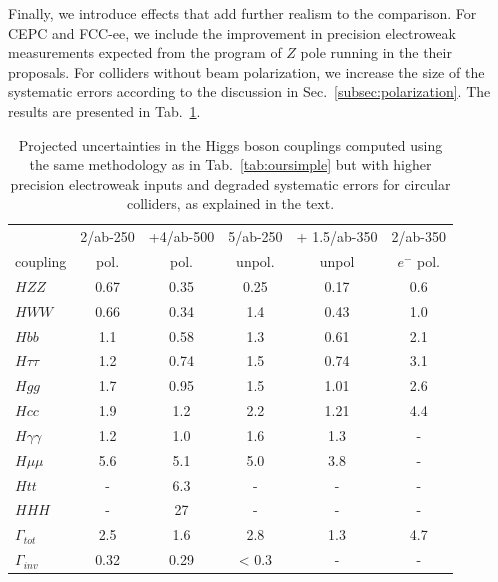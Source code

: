 Finally, we introduce effects that add further realism to the
comparison.  For CEPC and FCC-ee, we include the improvement in
precision electroweak measurements expected from the program of $Z$
pole running in the their proposals.  For colliders without beam
polarization, we increase the size of the systematic errors according
to the discussion in  
Sec.~\ref{subsec:polarization}. The results are presented in 
Tab.~\ref{tab:ournotsosimple}. 

\begin{table}[!htbp]
\begin{center}
\begin{tabular}{l|cc|c|c|c}
 &  2/ab-250 & +4/ab-500 &  5/ab-250 &  + 1.5/ab-350 &  2/ab-350 \\
coupling &  pol.  &   pol.  &   unpol.  &  unpol &  $e^-$  pol. 
  \\  \hline 
$HZZ$            &             0.67&   0.35    &   0.25   & 0.17     &  0.6            \\ 
$HWW$            &         0.66  &   0.34   &   1.4   &   0.43   &   1.0    \\ 
 $Hbb$            &     1.1  &  0.58   &  1.3    &    0.61  &   2.1       \\ 
$H\tau\tau$    &          1.2  &   0.74   &   1.5   &  0.74    &   3.1     \\ 
$Hgg$ &                      1.7  & 0.95       &  1.5    &  1.01    &   2.6    \\ 
$Hcc$                       &   1.9  &  1.2   &   2.2   &   1.21   &    4.4  \\ 
$H\gamma\gamma$ &  1.2 &   1.0     &  1.6    &   1.3   &    -    \\ 
$H\mu\mu$                &  5.6  &  5.1     &  5.0    &  3.8    &    -
 \\ 
$Htt$  &                       -     &      6.3     &  -    &  -    &
-     \\ 
$HHH$                         &  -    &   27     &   -   &   -   &   -
 \\ \hline 
$\Gamma_{tot}$             & 2.5  & 1.6    &   2.8    &  1.3     &
4.7    \\  
$\Gamma_{inv}$          &   0.32  & 0.29    &  < 0.3    &   -   &   -
\\  \hline
\end{tabular}
\end{center}
\caption{ \label{tab:ournotsosimple}    Projected uncertainties in the Higgs
  boson couplings computed using the same methodology as in Tab.~\ref{tab:oursimple} but with higher precision electroweak inputs and degraded systematic errors for circular colliders, as explained in the text.  }
\end{table}




